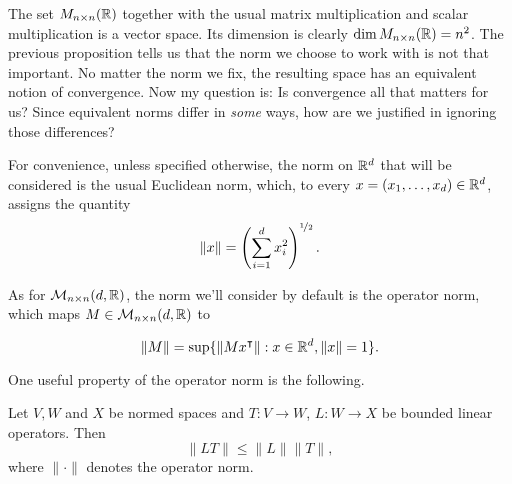 \begin{note}
	The set $M_{n \times n} (\mathbb{R})$ together with the usual matrix multiplication and scalar multiplication is a vector space. Its dimension is clearly $\dim M_{n \times n} (\mathbb{R}) = n^2$. The previous proposition tells us that the norm we choose to work with is not that important. No matter the norm we fix, the resulting space has an equivalent notion of convergence. Now my question is: Is convergence all that matters for us? Since equivalent norms differ in \textit{some} ways, how are we justified in ignoring those differences?
	
	
\end{note}
For convenience, unless specified otherwise, the norm on $\mathbb{R}^d$ that will be considered is the usual Euclidean norm, which, to every $x = (x_1, \ldots, x_d) \in \mathbb{R}^d$, assigns the quantity
\[
\lVert x \rVert = \left( \sum_{i=1}^d x_i^2 \right)^{\nicefrac{1}{2}}.
\]

As for $\mathcal{M}_{n \times n}(d,\mathbb{R})$, the norm we'll consider by default is the operator norm, which maps $M \in \mathcal{M}_{n \times n}(d,\mathbb{R})$ to

\[
\lVert M \rVert  = \sup \{  \lVert M x^\intercal \rVert  : x \in \mathbb{R}^d, \lVert x \rVert = 1 \}.
\]

One useful property of the operator norm is the following.
\begin{proposition}
	Let $V, W$ and $X$ be normed spaces and $T : V \to W$, $L :  W \to X$ be bounded linear operators. Then 
	\[
	\lVert LT \rVert \leq \lVert L \rVert \lVert T \rVert,
	\]
where $\lVert \cdot \rVert$ denotes the operator norm.
\end{proposition}